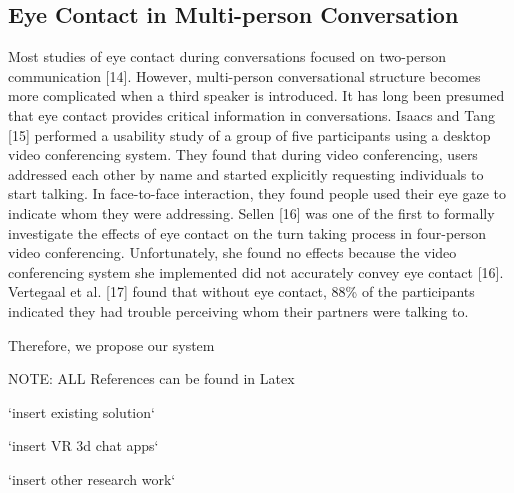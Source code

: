 \subsection{Eye Contact in Multi-person Conversation}

Most studies of eye contact during conversations focused on two-person communication [14]. 
However, multi-person conversational structure becomes more complicated when a third speaker is introduced. It has long been presumed that eye contact provides critical information in conversations. Isaacs and Tang [15] performed a usability study of a group of five participants using a desktop video conferencing system. They found that during video conferencing, users addressed each other by name and started explicitly requesting individuals to start talking. In face-to-face interaction, they found people used their eye gaze to indicate whom they were addressing. Sellen [16] was one of the first to formally investigate the effects of eye contact on the turn taking process in four-person video conferencing. Unfortunately, she found no effects because the video conferencing system she implemented did not accurately convey eye contact [16]. Vertegaal et al. [17] found that without eye contact, 88\% of the participants indicated they had trouble perceiving whom their partners were talking to.

Therefore, we propose our system

NOTE: ALL References can be found in Latex


`insert existing solution`

`insert VR 3d chat apps`

`insert other research work`
